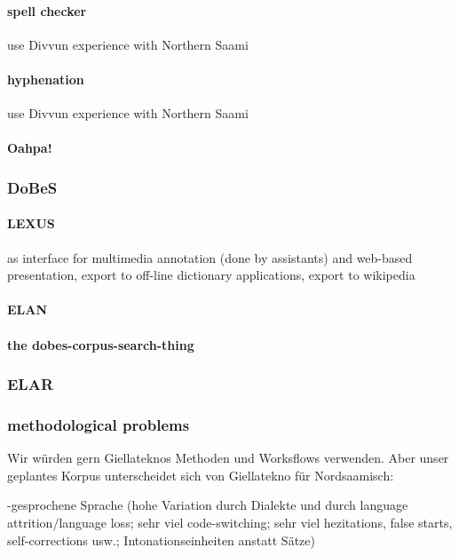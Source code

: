 \documentclass[a4paper,12pt]{article}
\begin{document}
\paragraph{spell checker} use Divvun experience with Northern Saami

\paragraph{hyphenation} use Divvun experience with Northern Saami

\paragraph{Oahpa!}

\subsubsection{DoBeS}

\paragraph{LEXUS} as interface for multimedia annotation (done by assistants) and web-based presentation, export to off-line dictionary applications, export to wikipedia

\paragraph{ELAN}

\paragraph{the dobes-corpus-search-thing}

\subsubsection{ELAR}

\subsubsection{methodological problems}

Wir würden gern Giellateknos Methoden und Worksflows verwenden. Aber unser geplantes Korpus unterscheidet sich von Giellatekno für Nordsaamisch:

-gesprochene Sprache (hohe Variation durch Dialekte und durch language attrition/language loss; sehr viel code-switching; sehr viel hezitations, false starts, self-corrections usw.; Intonationseinheiten anstatt Sätze)
\end{document}
